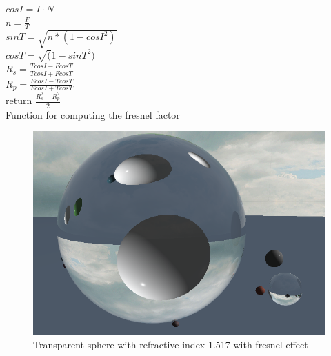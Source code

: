 \documentclass[final]{cmpreport}
\begin{document}
\begin{algorithm}
    \label{fresnelalgo}
    \SetAlgoLined

    $cosI = I \cdot N$ \\
    $n = \frac{F}{T}$ \\
    $sinT = \sqrt{n * (1 - cosI^2)}$ \\
    $cosT = \sqrt(1 - sinT^2)$ \\
    $R_s = \frac{TcosI - FcosT}{TcosI + FcosT}$ \\
    $R_p = \frac{FcosI - TcosT}{FcosI + TcosT}$ \\
    return $\frac{R_s^2 + R_p^2}{2}$ \\

    \caption{Function for computing the fresnel factor}
\end{algorithm}

\begin{figure}
    \centering
    \includegraphics[width=\textwidth]{img/fresnel_solid.png}
    \caption{Transparent sphere with refractive index 1.517 with fresnel effect}
    \label{fresnel_solid}
\end{figure}
\end{document}
